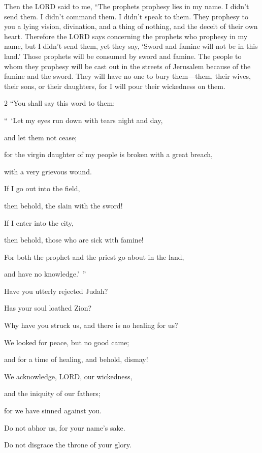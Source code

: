 \myverse{}Then the LORD said to me, “The prophets prophesy lies in my name. I didn’t send them. I didn’t command them. I didn’t speak to them. They prophesy to you a lying vision, divination, and a thing of nothing, and the deceit of their own heart. \myverse{}Therefore the LORD says concerning the prophets who prophesy in my name, but I didn’t send them, yet they say, ‘Sword and famine will not be in this land.’ Those prophets will be consumed by sword and famine. \myverse{}The people to whom they prophesy will be cast out in the streets of Jerusalem because of the famine and the sword. They will have no one to bury them—them, their wives, their sons, or their daughters, for I will pour their wickedness on them.

\begin{multicols}{2}
\myverse{}“You shall say this word to them:

“ ‘Let my eyes run down with tears night and day,

and let them not cease;

for the virgin daughter of my people is broken with a great breach,

with a very grievous wound.


\myverse{}If I go out into the field,

then behold, the slain with the sword!

If I enter into the city,

then behold, those who are sick with famine!

For both the prophet and the priest go about in the land,

and have no knowledge.’ ”


\vspace{\baselineskip}

\myverse{}Have you utterly rejected Judah?

Has your soul loathed Zion?

Why have you struck us, and there is no healing for us?

We looked for peace, but no good came;

and for a time of healing, and behold, dismay!


\myverse{}We acknowledge, LORD, our wickedness,

and the iniquity of our fathers;

for we have sinned against you.


\myverse{}Do not abhor us, for your name’s sake.

Do not disgrace the throne of your glory.


\end{multicols}
